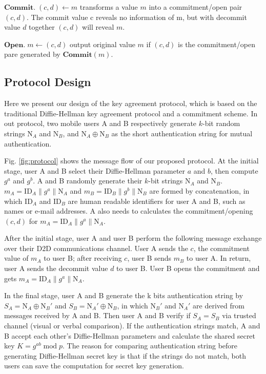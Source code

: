 \documentclass[conference]{IEEEtran}
\begin{document}
\noindent $\textbf{Commit}.\;(c, d)\leftarrow m$ transforms a value $m$ into a commitment/open pair $(c, d)$. The commit value c reveals no information of m, but with decommit value $d$ together $(c, d)$ will reveal $m$.

\noindent $\textbf{Open}.\;m\leftarrow (c, d)$ output original value $m$ if $(c, d)$ is the commitment/open pare generated by $\textbf{Commit}(m)$.

\subsection{Protocol Design}

Here we present our design of the key agreement protocol, which is based on the traditional Diffie-Hellman key agreement protocol and a commitment scheme. In out protocol, two mobile users A and B respectively generate $k$-bit random strings $\mathrm{N}_A$ and $\mathrm{N}_B$, and $\mathrm{N}_A\oplus \mathrm{N}_B$ as the short authentication string for mutual authentication.

Fig. \ref{fig:protocol} shows the message flow of our proposed protocol. At the initial stage, user A and B select their Diffie-Hellman parameter $a$ and $b$, then compute $g^a$ and $g^b$. A and B randomly generate their $k$-bit strings $\mathrm{N}_A$ and $\mathrm{N}_B$. $m_A= \mathrm{ID}_A\lVert g^a\rVert \mathrm{N}_A$ and $m_B= \mathrm{ID}_B\lVert g^b\rVert \mathrm{N}_B$ are formed by concatenation, in which $\mathrm{ID}_A$ and $\mathrm{ID}_B$ are human readable identifiers for user A and B, such as names or e-mail addresses. A also needs to calculates the commitment/opening $(c, d)$ for $m_A= \mathrm{ID}_A\lVert g^a\rVert \mathrm{N}_A$. 

After the initial stage, user A and user B perform the following message exchange over their D2D communications channel. User A sends the $c$, the commitment value of $m_A$ to user B; after receiving $c$, user B sends $m_B$ to user A. In return, user A sends the decommit value $d$ to user B. User B opens the commitment and gets $m_A= \mathrm{ID}_A\lVert g^a\rVert \mathrm{N}_A$. 

In the final stage, user A and B generate the k bits authentication string by $S_A=\mathrm{N}_A\oplus \mathrm{N}_B'$ and $S_B=\mathrm{N}_A'\oplus \mathrm{N}_B$, in which $\mathrm{N}_B'$ and $\mathrm{N}_A'$ are derived from messages received by A and B. Then user A and B verify if $S_A=S_B$ via trusted channel (visual or verbal comparison). If the authentication strings match, A and B accept each other's Diffie-Hellman parameters and calculate the shared secret key $K=g^{ab} \;\mathrm{mod}\; p$. The reason for comparing authentication string before generating Diffie-Hellman secret key is that if the strings do not match, both users can save the computation for secret key generation.
\end{document}
